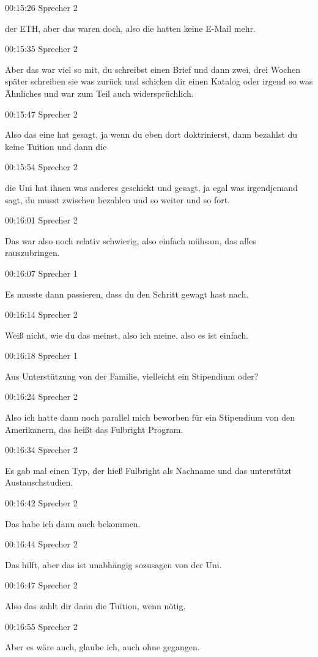 00:15:26 Sprecher 2

der ETH, aber das waren doch, also die hatten keine E-Mail mehr.

00:15:35 Sprecher 2

Aber das war viel so mit, du schreibst einen Brief und dann zwei, drei
Wochen später schreiben sie was zurück und schicken dir einen Katalog
oder irgend so was Ähnliches und war zum Teil auch widersprüchlich.

00:15:47 Sprecher 2

Also das eine hat gesagt, ja wenn du eben dort doktrinierst, dann
bezahlst du keine Tuition und dann die

00:15:54 Sprecher 2

die Uni hat ihnen was anderes geschickt und gesagt, ja egal was
irgendjemand sagt, du musst zwischen bezahlen und so weiter und so fort.

00:16:01 Sprecher 2

Das war also noch relativ schwierig, also einfach mühsam, das alles
rauszubringen.

00:16:07 Sprecher 1

Es musste dann passieren, dass du den Schritt gewagt hast nach.

00:16:14 Sprecher 2

Weiß nicht, wie du das meinst, also ich meine, also es ist einfach.

00:16:18 Sprecher 1

Aus Unterstützung von der Familie, vielleicht ein Stipendium oder?

00:16:24 Sprecher 2

Also ich hatte dann noch parallel mich beworben für ein Stipendium von
den Amerikanern, das heißt das Fulbright Program.

00:16:34 Sprecher 2

Es gab mal einen Typ, der hieß Fulbright als Nachname und das
unterstützt Austauschstudien.

00:16:42 Sprecher 2

Das habe ich dann auch bekommen.

00:16:44 Sprecher 2

Das hilft, aber das ist unabhängig sozusagen von der Uni.

00:16:47 Sprecher 2

Also das zahlt dir dann die Tuition, wenn nötig.

00:16:55 Sprecher 2

Aber es wäre auch, glaube ich, auch ohne gegangen.


